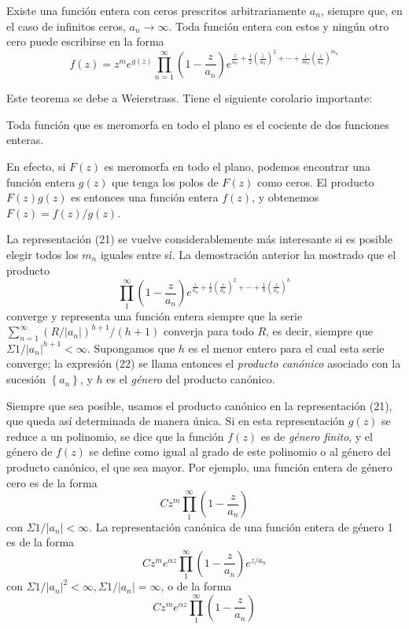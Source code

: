 \documentclass{article}
\theoremstyle{nonumberplain}
\begin{document}
\begin{theorem}[7]
Existe una función entera con ceros prescritos arbitrariamente \( a_{n} \), siempre que, en el caso de infinitos ceros, \( a_{n} \rightarrow \infty \). Toda función entera con estos y ningún otro cero puede escribirse en la forma
\[
f(z)=z^{m} e^{g(z)} \prod_{n=1}^{\infty}\left(1-\frac{z}{a_{n}}\right) e^{\frac{z}{a_{n}}+\frac{1}{2}\left(\frac{z}{a_{n}}\right)^{2}+\cdots+\frac{1}{m_{n}}\left(\frac{z}{a_{n}}\right)^{m_{n}}}
\]

Este teorema se debe a Weierstrass. Tiene el siguiente corolario importante:

\begin{corollary}
Toda función que es meromorfa en todo el plano es el cociente de dos funciones enteras.
\end{corollary}

En efecto, si \( F(z) \) es meromorfa en todo el plano, podemos encontrar una función entera \( g(z) \) que tenga los polos de \( F(z) \) como ceros. El producto \( F(z) g(z) \) es entonces una función entera \( f(z) \), y obtenemos \( F(z)=f(z)/g(z) \).

La representación (21) se vuelve considerablemente más interesante si es posible elegir todos los \( m_{n} \) iguales entre sí. La demostración anterior ha mostrado que el producto
\[
\prod_{1}^{\infty}\left(1-\frac{z}{a_{n}}\right) e^{\frac{z}{a_{n}}+\frac{1}{2}\left(\frac{z}{a_{n}}\right)^{2}+\cdots+\frac{1}{h}\left(\frac{z}{a_{n}}\right)^{h}}
\]
converge y representa una función entera siempre que la serie \( \sum_{n=1}^{\infty}\left(R /\left|a_{n}\right|\right)^{h+1} /(h+1) \) converja para todo \( R \), es decir, siempre que \( \Sigma 1 /\left|a_{n}\right|^{h+1}<\infty \). Supongamos que \( h \) es el menor entero para el cual esta serie converge; la expresión (22) se llama entonces el \textit{producto canónico} asociado con la sucesión \( \left\{a_{n}\right\} \), y \( h \) es el \textit{género} del producto canónico.

Siempre que sea posible, usamos el producto canónico en la representación (21), que queda así determinada de manera única. Si en esta representación \( g(z) \) se reduce a un polinomio, se dice que la función \( f(z) \) es de \textit{género finito}, y el género de \( f(z) \) se define como igual al grado de este polinomio o al género del producto canónico, el que sea mayor. Por ejemplo, una función entera de género cero es de la forma
\[
C z^{m} \prod_{1}^{\infty}\left(1-\frac{z}{a_{n}}\right)
\]
con \( \Sigma 1 /\left|a_{n}\right|<\infty \). La representación canónica de una función entera de género 1 es de la forma
\[
C z^{m} e^{\alpha z} \prod_{1}^{\infty}\left(1-\frac{z}{a_{n}}\right) e^{z / a_{n}}
\]
con \( \Sigma 1 /\left|a_{n}\right|^{2}<\infty, \Sigma 1 /\left|a_{n}\right|=\infty \), o de la forma
\[
C z^{m} e^{\alpha z} \prod_{1}^{\infty}\left(1-\frac{z}{a_{n}}\right)
\]


\end{theorem}
\end{document}
